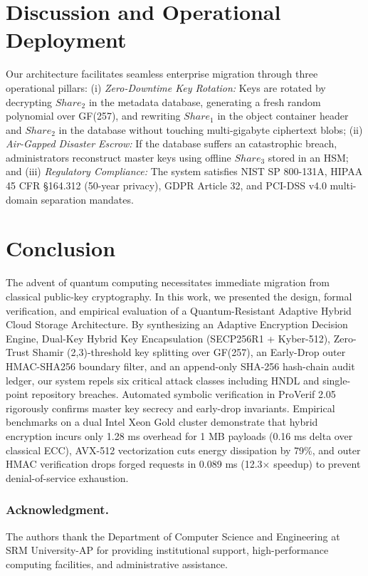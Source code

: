 \documentclass{llncs}
\begin{document}
\section{Discussion and Operational Deployment}
Our architecture facilitates seamless enterprise migration through three operational pillars: (i) \emph{Zero-Downtime Key Rotation:} Keys are rotated by decrypting $Share_2$ in the metadata database, generating a fresh random polynomial over GF(257), and rewriting $Share_1$ in the object container header and $Share_2$ in the database without touching multi-gigabyte ciphertext blobs; (ii) \emph{Air-Gapped Disaster Escrow:} If the database suffers an catastrophic breach, administrators reconstruct master keys using offline $Share_3$ stored in an HSM; and (iii) \emph{Regulatory Compliance:} The system satisfies NIST SP 800-131A, HIPAA 45 CFR \S164.312 (50-year privacy), GDPR Article 32, and PCI-DSS v4.0 multi-domain separation mandates.

\section{Conclusion}
The advent of quantum computing necessitates immediate migration from classical public-key cryptography. In this work, we presented the design, formal verification, and empirical evaluation of a Quantum-Resistant Adaptive Hybrid Cloud Storage Architecture. By synthesizing an Adaptive Encryption Decision Engine, Dual-Key Hybrid Key Encapsulation (SECP256R1 + Kyber-512), Zero-Trust Shamir (2,3)-threshold key splitting over GF(257), an Early-Drop outer HMAC-SHA256 boundary filter, and an append-only SHA-256 hash-chain audit ledger, our system repels six critical attack classes including HNDL and single-point repository breaches. Automated symbolic verification in ProVerif 2.05 rigorously confirms master key secrecy and early-drop invariants. Empirical benchmarks on a dual Intel Xeon Gold cluster demonstrate that hybrid encryption incurs only 1.28 ms overhead for 1 MB payloads (0.16 ms delta over classical ECC), AVX-512 vectorization cuts energy dissipation by 79\%, and outer HMAC verification drops forged requests in 0.089 ms (12.3$\times$ speedup) to prevent denial-of-service exhaustion.

\newpage
\subsubsection*{Acknowledgment.}
The authors thank the Department of Computer Science and Engineering at SRM University-AP for providing institutional support, high-performance computing facilities, and administrative assistance.

%
%


\end{document}
